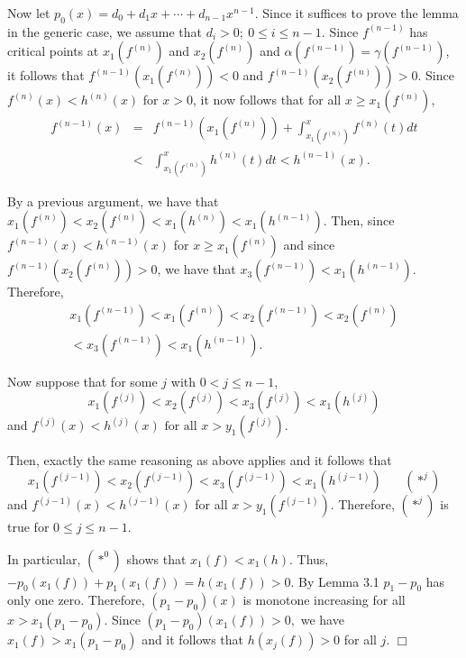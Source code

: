 Now let $p_0 (x) = d_0 + d_1 x + \cdots + d_{n-1} x^{n-1}$. Since it
suffices to prove the lemma in the generic case, we assume that
$d_{i} > 0 ; \ 0 \leq i \leq n-1.$ Since $f^{(n-1)}$ has critical
points at $x_1 (f^{(n)})$ and $x_2 (f^{(n)})$ and $\alpha (f^{(n-1)})
= \gamma (f^{(n-1)})$, it follows that $f^{(n-1)} (x_1 (f^{(n)})) <
0$ and $f^{(n-1)} (x_2 (f^{(n)})) > 0$.  Since $f^{(n)} (x) < h^{(n)}
(x)$ for $x > 0$, it now follows that for all $x \geq x_1 (f^{(n)})$,
\begin{eqnarray*} f^{(n-1)} (x) &=& f^{(n-1)} \left(x_1
\left(f^{(n)}\right)\right) + \int^x_{x_1 \left(f^{(n)}\right)}
f^{(n)} (t) dt\\[2ex] &<& \int^x_{x_1 \left(f^{(n)}\right)} h^{(n)}
(t) dt < h^{(n-1)} (x).\end{eqnarray*}

By a previous argument, we have that $x_1 (f^{(n)}) < x_2 (f^{(n)}) <
x_1 (h^{(n)}) < x_1 (h^{(n-1)})$.  Then, since $f^{(n-1)}  (x) <
h^{(n-1)} (x)$ for $x \geq x_1 (f^{(n)})$ and since $f^{(n-1)} (x_2
(f^{(n)})) > 0$, we have that $x_3 (f^{(n-1)}) < x_1 (h^{(n-1)})$.  Therefore,
$$\begin{array}{c}
\displaystyle{x_1 \left(f^{(n-1)}\right) < x_1
\left(f^{(n)}\right) < x_2 \left(f^{(n-1)}\right) < x_2
\left(f^{(n)}\right)}\\[2ex]
\displaystyle{< x_3 \left(f^{(n-1)}\right) < x_1
\left(h^{(n-1)}\right).}\end{array}$$\vspace{12pt}

Now suppose that for some $j$ with $0 < j \leq n-1$, $$x_1 (f^{(j)})
< x_2 (f^{(j)}) < x_3 (f^{(j)}) < x_1 (h^{(j)})$$ and $f^{(j)} (x) <
h^{(j)} (x) \mbox{ for all } x > y_1 (f^{(j)})$.

Then, exactly the same reasoning as above applies and it follows that
$$x_1 \left(f^{(j-1)}\right) < x_2 \left(f^{(j-1)}\right) < x_3
\left(f^{(j-1)}\right) < x_1 \left(h^{(j-1)}\right) \ \ \ \ \ \ \ \
(*^{j}) $$ and $f^{(j-1)} (x) < h^{(j-1)} (x)$ for all $x > y_1
(f^{(j-1)})$.  Therefore, $(\ast^j)$ is true for $0 \leq j \leq n-1$.


In particular, $(\ast^0)$ shows that $x_1 (f) < x_1 (h)$.  Thus,
$-p_0 (x_1 (f)) + p_1 (x_1(f)) = h(x_1(f)) > 0$.  By Lemma 3.1 $p_1 - 
p_0$ has only one zero. Therefore, $(p_1 - p_0)(x)$ is monotone
increasing for all $x > x_1 (p_1 - p_0)$.  Since $(p_1 - p_0) (x_1
(f)) > 0,$ we have $x_1 (f) > x_1 (p_1 - p_0)$ and it follows that $h(x_j
(f)) > 0$ for all $j$. $\Box$

